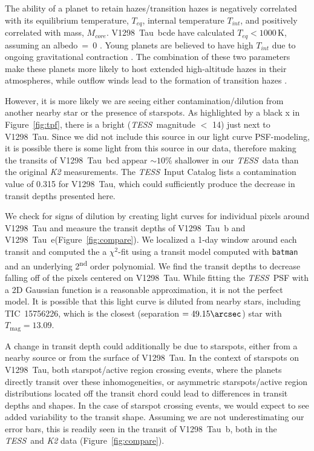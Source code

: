 \documentclass[twocolumn]{aastex631}
\newcommand{\tess}{\textit{TESS}}
\newcommand{\sname}{V1298~Tau\xspace}
\newcommand{\allplanets}{V1298~Tau~bcde\xspace}
\newcommand{\planetb}{V1298~Tau~b\xspace}
\newcommand{\planete}{V1298~Tau~e\xspace}
\newcommand{\planetknown}{V1298~Tau~bcd\xspace}
\begin{document}
The ability of a planet to retain hazes/transition hazes is negatively correlated with its equilibrium temperature, $T_{eq}$, internal temperature $T_{int}$, and positively correlated with mass, $M_{core}$. \allplanets have calculated $T_{eq} < 1000$\,K, assuming an albedo~=~0 \citep{David2019a}. Young planets are believed to have high $T_{int}$ due to ongoing gravitational contraction \citep{gu04}. The combination of these two parameters make these planets more likely to host extended high-altitude hazes in their atmospheres, while outflow winds lead to the formation of transition hazes \citep{gao20}. 

However, it is more likely we are seeing either contamination/dilution from another nearby star or the presence of starspots. As highlighted by a black x in Figure~\ref{fig:tpf}, there is a bright (\tess\ magnitude $<$ 14) just next to \sname. Since we did not include this source in our light curve PSF-modeling, it is possible there is some light from this source in our data, therefore making the transits of \planetknown appear $\sim 10$\% shallower in our \tess\ data than the original \textit{K2} measurements. The \tess\ Input Catalog \citep{stassun18} lists a contamination value of 0.315 for \sname, which could sufficiently produce the decrease in transit depths presented here. 

We check for signs of dilution by creating light curves for individual pixels around \sname and measure the transit depths of \planetb and \planete (Figure~\ref{fig:compare}). We localized a 1-day window around each transit and computed the a $\chi^2$-fit using a transit model computed with \texttt{batman} \citep{Kreidberg15} and an underlying 2\textsuperscript{nd} order polynomial. We find the transit depths to decrease falling off of the pixels centered on \sname. While fitting the \tess\ PSF with a 2D Gaussian function is a reasonable approximation, it is not the perfect model. It is possible that this light curve is diluted from nearby stars, including TIC~15756226, which is the closest (separation $= 49.15\arcsec$) star with $T_\textrm{mag} = 13.09$.

A change in transit depth could additionally be due to starspots, either from a nearby source or from the surface of \sname. In the context of starspots on \sname, both starspot/active region crossing events, where the planets directly transit over these inhomogeneities, or asymmetric starspots/active region distributions located off the transit chord could lead to differences in transit depths and shapes. In the case of starspot crossing events, we would expect to see added variability to the transit shape. Assuming we are not underestimating our error bars, this is readily seen in the transit of \planetb, both in the \tess\ and \textit{K2} data (Figure~\ref{fig:compare}). 
\end{document}
